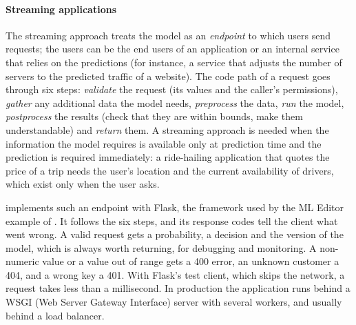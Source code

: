 \paragraph{Streaming applications} The streaming approach treats the model as an \emph{endpoint}
to which users send requests; the users can be the end users of an application or an internal
service that relies on the predictions (for instance, a service that adjusts the number of servers
to the predicted traffic of a website). The code path of a request goes through six steps:
\emph{validate} the request (its values and the caller's permissions), \emph{gather} any additional
data the model needs, \emph{preprocess} the data, \emph{run} the model, \emph{postprocess} the results
(check that they are within bounds, make them understandable) and \emph{return} them. A streaming
approach is needed when the information the model requires is available only at prediction time and
the prediction is required immediately: a ride-hailing application that quotes the price of a trip
needs the user's location and the current availability of drivers, which exist only when the user
asks.

 implements such an endpoint with Flask, the framework used by the ML Editor example of
\citet{ameisen2020building}. It follows the six steps, and its response codes tell the client what
went wrong. A valid request gets a probability, a decision and the version of the model, which is always
worth returning, for debugging and monitoring. A non-numeric value or a value out of range gets a
400 error, an unknown customer a 404, and a wrong key a 401. With Flask's test client, which skips
the network, a request takes less than a millisecond. In production the application runs behind a
WSGI (Web Server Gateway Interface) server with several workers, and usually behind a load balancer.

